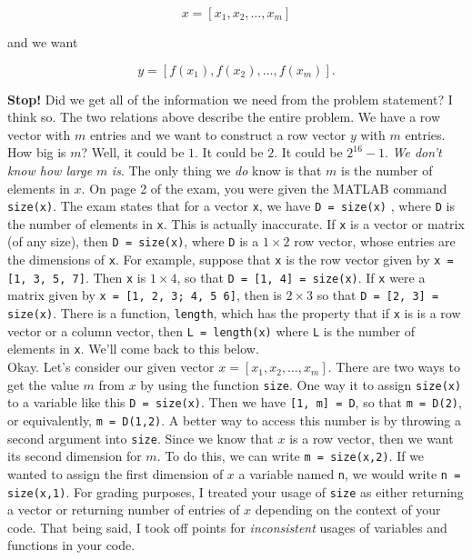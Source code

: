 \documentclass{article}
\begin{document}
\[
x = [x_1, x_2, \dots, x_m]
\]

{\setlength{\parindent}{0cm}
and we want}

\[
y = [f(x_1), f(x_2), \dots, f(x_m)].
\] 

\textbf{Stop!} Did we get all of the information we need from the problem statement? I think so. The two relations above describe the entire problem. We have a row vector with $m$ entries and we want to construct a row vector $y$ with $m$ entries. \\ 

How big is $m$? Well, it could be $1$. It could be $2$. It could be $2^{16}-1$. \textit{We don't know how large} $m$ \textit{is}. The only thing we \textit{do} know is that $m$ is the number of elements in $x$. On page 2 of the exam, you were given the MATLAB command \texttt{size(x)}. The exam states that for a vector \texttt{x}, we have \texttt{D = size(x)} , where \texttt{D} is the number of elements in \texttt{x}. This is actually inaccurate. If \texttt{x} is a vector or matrix (of any size), then \texttt{D = size(x)}, where \texttt{D} is a $1 \times 2$ row vector, whose entries are the dimensions of \texttt{x}. For example, suppose that \texttt{x} is the row vector given by \texttt{x = [1, 3, 5, 7]}. Then \texttt{x} is $1 \times 4$, so that \texttt{D = [1, 4] = size(x)}. If \texttt{x} were a matrix given by \texttt{x = [1, 2, 3; 4, 5 6]}, then  is $2 \times 3$ so that \texttt{D = [2, 3] = size(x)}. There is a function, \texttt{length}, which has the property that if \texttt{x} is is a row vector or a column vector, then \texttt{L = length(x)} where \texttt{L} is the number of elements in \texttt{x}. We'll come back to this below. \\

 Okay. Let's consider our given vector $x = [x_1, x_2, \dots, x_m]$. There are two ways to get the value $m$ from $x$ by using the function \texttt{size}. One way it to assign \texttt{size(x)} to a variable like this \texttt{D = size(x)}. Then we have \texttt{[1, m] = D}, so that \texttt{m = D(2)}, or equivalently, \texttt{m = D(1,2)}. A better way to access this number is by throwing a second argument into \texttt{size}. Since we know that $x$ is a row vector, then we want its second dimension for $m$. To do this, we can write \texttt{m = size(x,2)}. If we wanted to assign the first dimension of $x$ a variable named \texttt{n}, we would write \texttt{n = size(x,1)}. For grading purposes, I treated your usage of \texttt{size} as either returning a vector or returning number of entries of $x$ depending on the context of your code. That being said, I took off points for \emph{inconsistent} usages of variables and functions in your code.\\
\end{document}
